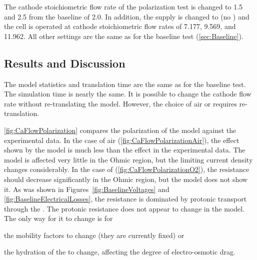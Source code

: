 The cathode stoichiometric flow rate of the polarization test is changed to 1.5 and 2.5 from the 
baseline of 2.0.  In addition, the supply is changed to  (no ) and the cell is operated at cathode stoichiometric flow rates of 7.177, 9.569, and 11.962.  All other settings are the same as for the baseline test (\autoref{sec:Baseline}).

\subsection{Results and Discussion}

The model statistics and translation time are the same as for the baseline test.  The simulation time is nearly the same.  It is possible to change the cathode flow rate without re-translating the model.  However, the choice of air or  requires re-translation.

\autoref{fig:CaFlowPolarization} compares the polarization of the model against the experimental data.  In the case of air (\autoref{fig:CaFlowPolarizationAir}), the effect shown by the model is much less than the effect in the experimental data.  The model is affected very little in the Ohmic region, but the limiting current density changes considerably.  In the case of  (\autoref{fig:CaFlowPolarizationO2}), the resistance should decrease significantly in the Ohmic region, but the model does not show it.  As was shown in Figures~\ref{fig:BaselineVoltages} and \ref{fig:BaselineElectricalLosses}, the resistance is dominated by protonic transport through the .  The protonic resistance does not appear to change in the model.  The only way for it to change is for \begin{inparaenum}[(1)]\item the mobility factors to change (they are currently fixed) or \item the hydration of the  to change, affecting the degree of electro-osmotic drag.\end{inparaenum}

